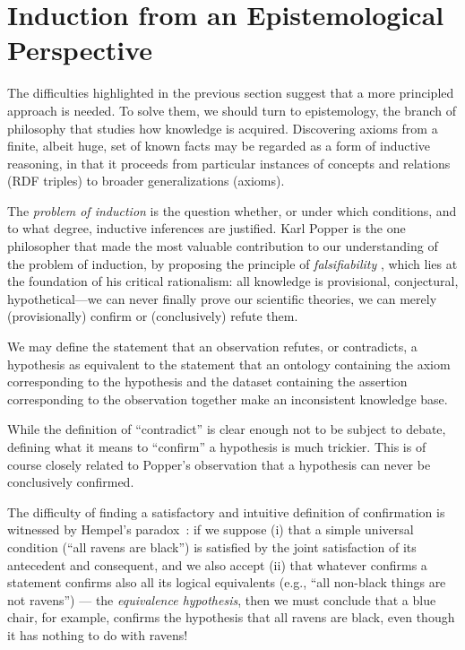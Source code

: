 \documentclass{llncs}
\begin{document}
\section{Induction from an Epistemological Perspective}
\label{epistemology}

The difficulties highlighted in the previous section suggest that a more
principled approach is needed. To solve them, we should turn to epistemology,
the branch of philosophy that studies how knowledge is acquired.
Discovering axioms from a finite, albeit huge, set of known facts
may be regarded as a form of inductive reasoning, in that it proceeds
from particular instances of concepts and relations (RDF triples)
to broader generalizations (axioms).

The \emph{problem of induction} is the question whether, or under which conditions,
and to what degree, inductive inferences are justified.
Karl Popper is the one philosopher that made the most valuable contribution
to our understanding of the problem of induction, by proposing the principle
of \emph{falsifiability} \cite{Popper1935}, which lies at the foundation of his critical rationalism:
all knowledge is provisional, conjectural, hypothetical---we can never finally
prove our scientific theories, we can merely (provisionally) confirm or
(conclusively) refute them.

We may define the statement that an observation refutes, or contradicts, a hypothesis
as equivalent to the statement that an ontology containing the axiom corresponding to the hypothesis
and the dataset containing the assertion corresponding to the observation together make an
inconsistent knowledge base.

While the definition of ``contradict'' is clear enough not to be subject to debate,
defining what it means to ``confirm'' a hypothesis is much trickier. This is
of course closely related to Popper's observation that a hypothesis can never be
conclusively confirmed.

The difficulty of finding a satisfactory and intuitive definition of confirmation
is witnessed by Hempel's paradox~\cite{Hempel1945}:
if we suppose (i) that a simple universal condition (``all ravens are black'')
is satisfied by the joint satisfaction of its antecedent and consequent, and we
also accept (ii) that whatever confirms a statement confirms also all its logical
equivalents (e.g., ``all non-black things are not ravens'') --- the \emph{equivalence hypothesis},
then we must conclude that a blue chair, for example, confirms the hypothesis
that all ravens are black, even though it has nothing to do with ravens! 
\end{document}

